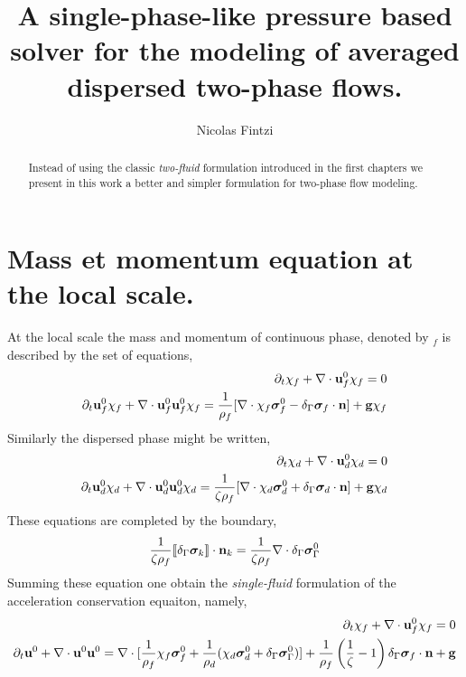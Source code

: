 \documentclass[12pt]{My_preprint}
\title{A single-phase-like pressure based solver for the modeling of averaged dispersed two-phase flows.  }
\author[1,2]{Nicolas Fintzi}
\begin{document}
\maketitle

\begin{abstract}
    Instead of using the classic \textit{two-fluid} formulation introduced in the first chapters we present in this work a better and simpler formulation for two-phase flow modeling. 
\end{abstract}


\section{Mass et momentum equation at the local scale. }

At the local scale the mass and momentum of continuous phase, denoted by $_f$ is described by the set of equations, 
\begin{align*}
    \partial_t \chi_f + \mathbf{\nabla}\cdot \textbf{u}_f^0 \chi_f  = 0\\
    \partial_t  \textbf{u}_f^0 \chi_f   
    + \mathbf{\nabla}\cdot \textbf{u}_f^0 \textbf{u}_f^0 \chi_f  = 
    \frac{1}{\rho_f}[\mathbf{\nabla}\cdot \chi_f \bm\sigma_f^0 
    - \delta_\Gamma \bm\sigma_f \cdot \textbf{n}]
    + \textbf{g}\chi_f 
\end{align*}
Similarly the dispersed phase might be written, 
\begin{align*}
    \partial_t \chi_d + \mathbf{\nabla}\cdot \textbf{u}_d^0 \chi_d  = 0\\
    \partial_t  \textbf{u}_d^0 \chi_d   
    + \mathbf{\nabla}\cdot \textbf{u}_d^0 \textbf{u}_d^0 \chi_d   = 
    \frac{1}{\zeta \rho_f} [\mathbf{\nabla}\cdot \chi_d \bm\sigma_d^0 
    + \delta_\Gamma \bm\sigma_d \cdot \textbf{n}]
    + \textbf{g}\chi_d 
\end{align*}
These equations are completed by the boundary, 
\begin{equation}
    \frac{1}{\zeta \rho_f}
    \llbracket \delta_\Gamma \bm\sigma_k \rrbracket \cdot \textbf{n}_k 
    = 
    \frac{1}{\zeta \rho_f}
    \mathbf{\nabla}\cdot\delta_\Gamma \bm\sigma_\Gamma^0
\end{equation}
Summing these equation one obtain the \textit{single-fluid} formulation of the acceleration conservation equaiton, namely, 
\begin{align*}
    \partial_t \chi_f + \mathbf{\nabla}\cdot \textbf{u}_f^0 \chi_f  = 0\\
    \partial_t  \textbf{u}^0   
    + \mathbf{\nabla}\cdot \textbf{u}^0 \textbf{u}^0  = 
    \mathbf{\nabla}\cdot[\frac{1}{\rho_f}\chi_f \bm\sigma_f^0 
    +\frac{1}{\rho_d} (\chi_d \bm\sigma_d^0  + \delta_\Gamma \bm\sigma_\Gamma^0)]
    + \frac{1}{\rho_f}\left(\frac{1}{\zeta} -1\right)
    \delta_\Gamma \bm\sigma_f \cdot \textbf{n}
    + \textbf{g}
\end{align*}
\end{document}
